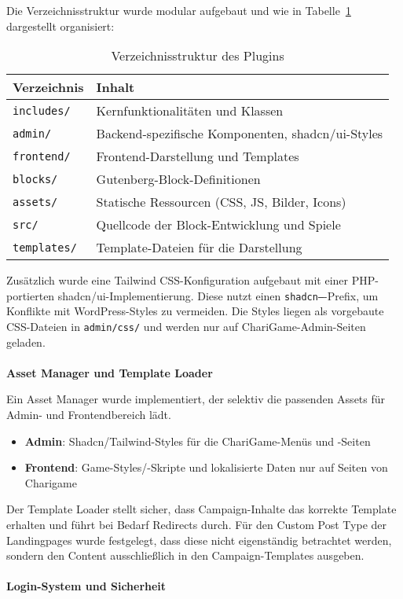Die Verzeichnisstruktur wurde modular aufgebaut und wie in Tabelle~\ref{tab:directory-structure} dargestellt organisiert:

\begin{table}[H]
    \centering
    \begin{tabular}{|l|p{8cm}|}
        \hline
        \textbf{Verzeichnis} & \textbf{Inhalt} \\
        \hline
        \texttt{includes/} & Kernfunktionalitäten und Klassen \\
        \texttt{admin/} & Backend-spezifische Komponenten, shadcn/ui-Styles \\
        \texttt{frontend/} & Frontend-Darstellung und Templates \\
        \texttt{blocks/} & Gutenberg-Block-Definitionen \\
        \texttt{assets/} & Statische Ressourcen (CSS, JS, Bilder, Icons) \\
        \texttt{src/} & Quellcode der Block-Entwicklung und Spiele  \\
        \texttt{templates/} & Template-Dateien für die Darstellung \\
        \hline
    \end{tabular}
    \caption{Verzeichnisstruktur des Plugins}
    \label{tab:directory-structure}
\end{table}

Zusätzlich wurde eine Tailwind CSS-Konfiguration aufgebaut mit einer PHP-portierten shadcn/ui-Implementierung.
Diese nutzt einen \texttt{shadcn--}-Prefix, um Konflikte mit WordPress-Styles zu vermeiden.
Die Styles liegen als vorgebaute CSS-Dateien in \texttt{admin/css/} und werden nur auf ChariGame-Admin-Seiten geladen.
\\\\
\textbf{Asset Manager und Template Loader}

Ein Asset Manager wurde implementiert, der selektiv die passenden Assets für Admin- und Frontendbereich lädt.
\begin{itemize}
    \item \textbf{Admin}: Shadcn/Tailwind-Styles für die ChariGame-Menüs und -Seiten
    \item \textbf{Frontend}: Game-Styles/-Skripte und lokalisierte Daten nur auf Seiten von Charigame
\end{itemize}

Der Template Loader stellt sicher, dass Campaign-Inhalte das korrekte Template erhalten und führt bei Bedarf Redirects durch.
Für den Custom Post Type der Landingpages wurde festgelegt, dass diese nicht eigenständig betrachtet werden, sondern den Content ausschließlich in den Campaign-Templates ausgeben.
\\\\
\textbf{Login-System und Sicherheit}

